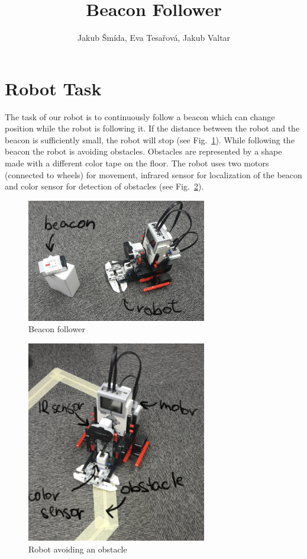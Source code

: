 \documentclass[a4paper]{article}
\title{Beacon Follower}
\author{Jakub \v{S}m\'{i}da, Eva Tesa\v{r}ov\'{a}, Jakub Valtar}
\date{}
\begin{document}
\maketitle
\section*{Robot Task}
The task of our robot is to continuously follow a beacon which can change position while the robot is following it. If the distance between the robot and the beacon is sufficiently small, the robot will stop (see Fig.~\ref{fig:beacon}). While following the beacon the robot is avoiding obstacles. Obstacles are represented by a shape made with a different color tape on the floor. The robot uses two motors (connected to wheels) for movement, infrared sensor for localization of the beacon and color sensor for detection of obstacles (see Fig.~\ref{fig:obstacle}).  

\begin{figure}[h]
\centering
\includegraphics[width=0.7\textwidth]{beacon.png}
\caption{\label{fig:beacon}Beacon follower}
\end{figure}

\begin{figure}[h]
\centering
\includegraphics[width=0.7\textwidth]{obstacle.png}
\caption{\label{fig:obstacle}Robot avoiding an obstacle}
\end{figure}
\end{document}
